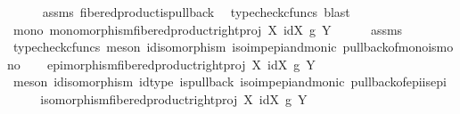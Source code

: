 \begin{isabellebody}
\ \ \ \ \isamarkupfalse%
\ assms\ fibered{\isacharunderscore}{\kern0pt}product{\isacharunderscore}{\kern0pt}is{\isacharunderscore}{\kern0pt}pullback\ \isamarkupfalse%
\ {\isacharparenleft}{\kern0pt}typecheck{\isacharunderscore}{\kern0pt}cfuncs{\isacharcomma}{\kern0pt}\ blast{\isacharparenright}{\kern0pt}\isanewline
\ \ \isamarkupfalse%
\ \isamarkupfalse%
\ mono{\isacharcolon}{\kern0pt}\ {\isachardoublequoteopen}monomorphism{\isacharparenleft}{\kern0pt}fibered{\isacharunderscore}{\kern0pt}product{\isacharunderscore}{\kern0pt}right{\isacharunderscore}{\kern0pt}proj\ X\ {\isacharparenleft}{\kern0pt}id{\isacharparenleft}{\kern0pt}X{\isacharparenright}{\kern0pt}{\isacharparenright}{\kern0pt}\ g\ Y{\isacharparenright}{\kern0pt}{\isachardoublequoteclose}\isanewline
\ \ \ \ \isamarkupfalse%
\ assms\ \isamarkupfalse%
\ {\isacharparenleft}{\kern0pt}typecheck{\isacharunderscore}{\kern0pt}cfuncs{\isacharcomma}{\kern0pt}\ meson\ id{\isacharunderscore}{\kern0pt}isomorphism\ iso{\isacharunderscore}{\kern0pt}imp{\isacharunderscore}{\kern0pt}epi{\isacharunderscore}{\kern0pt}and{\isacharunderscore}{\kern0pt}monic\ pullback{\isacharunderscore}{\kern0pt}of{\isacharunderscore}{\kern0pt}mono{\isacharunderscore}{\kern0pt}is{\isacharunderscore}{\kern0pt}mono{}{\isacharparenright}{\kern0pt}\isanewline
\ \ \isamarkupfalse%
\ {\isachardoublequoteopen}epimorphism{\isacharparenleft}{\kern0pt}fibered{\isacharunderscore}{\kern0pt}product{\isacharunderscore}{\kern0pt}right{\isacharunderscore}{\kern0pt}proj\ X\ {\isacharparenleft}{\kern0pt}id{\isacharparenleft}{\kern0pt}X{\isacharparenright}{\kern0pt}{\isacharparenright}{\kern0pt}\ g\ Y{\isacharparenright}{\kern0pt}{\isachardoublequoteclose}\isanewline
\ \ \ \ \isamarkupfalse%
\ {\isacharparenleft}{\kern0pt}meson\ id{\isacharunderscore}{\kern0pt}isomorphism\ id{\isacharunderscore}{\kern0pt}type\ is{\isacharunderscore}{\kern0pt}pullback\ iso{\isacharunderscore}{\kern0pt}imp{\isacharunderscore}{\kern0pt}epi{\isacharunderscore}{\kern0pt}and{\isacharunderscore}{\kern0pt}monic\ pullback{\isacharunderscore}{\kern0pt}of{\isacharunderscore}{\kern0pt}epi{\isacharunderscore}{\kern0pt}is{\isacharunderscore}{\kern0pt}epi{}{\isacharparenright}{\kern0pt}\isanewline
\ \ \isamarkupfalse%
\ \isamarkupfalse%
\ {\isachardoublequoteopen}isomorphism{\isacharparenleft}{\kern0pt}fibered{\isacharunderscore}{\kern0pt}product{\isacharunderscore}{\kern0pt}right{\isacharunderscore}{\kern0pt}proj\ X\ {\isacharparenleft}{\kern0pt}id{\isacharparenleft}{\kern0pt}X{\isacharparenright}{\kern0pt}{\isacharparenright}{\kern0pt}\ g\ Y{\isacharparenright}{\kern0pt}{\isachardoublequoteclose}\isanewline

\end{isabellebody}
